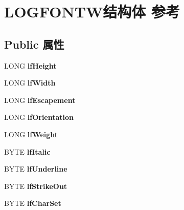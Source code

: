 \hypertarget{struct_l_o_g_f_o_n_t_w}{}\section{L\+O\+G\+F\+O\+N\+T\+W结构体 参考}
\label{struct_l_o_g_f_o_n_t_w}
\subsection*{Public 属性}
\begin{DoxyCompactItemize}
\item 
\mbox{\label{struct_l_o_g_f_o_n_t_w_a640676fc81b82ec8f2296218ec5871b7}} 
L\+O\+NG {\bfseries lf\+Height}
\item 
\mbox{\label{struct_l_o_g_f_o_n_t_w_a90a2b2e91b4cd8920fc9d62f91e70e7b}} 
L\+O\+NG {\bfseries lf\+Width}
\item 
\mbox{\label{struct_l_o_g_f_o_n_t_w_ac3c77bf7314968f38cb20b51d628ba4a}} 
L\+O\+NG {\bfseries lf\+Escapement}
\item 
\mbox{\label{struct_l_o_g_f_o_n_t_w_a8d5b942f6ccd98fbe7c83de8ceb68001}} 
L\+O\+NG {\bfseries lf\+Orientation}
\item 
\mbox{\label{struct_l_o_g_f_o_n_t_w_a7ce86648b6fb40b6644416373c53098c}} 
L\+O\+NG {\bfseries lf\+Weight}
\item 
\mbox{\label{struct_l_o_g_f_o_n_t_w_a61f8e32ff7d6b57057943a455566ad75}} 
B\+Y\+TE {\bfseries lf\+Italic}
\item 
\mbox{\label{struct_l_o_g_f_o_n_t_w_ab17dbc4b1ed9f85808e994135292795e}} 
B\+Y\+TE {\bfseries lf\+Underline}
\item 
\mbox{\label{struct_l_o_g_f_o_n_t_w_a49bd3103c6159ddeee2da6ce75403e72}} 
B\+Y\+TE {\bfseries lf\+Strike\+Out}
\item 
\mbox{\label{struct_l_o_g_f_o_n_t_w_ace0895aad528ece531d56c6f73725be3}} 
B\+Y\+TE {\bfseries lf\+Char\+Set}
\item 

\end{DoxyCompactItemize}
